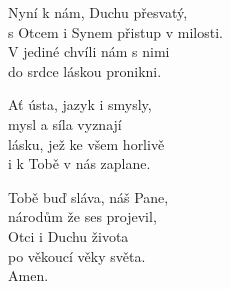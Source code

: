 \begin{translatioMulticol}{3}
Nyní k nám, Duchu přesvatý,\\
s Otcem i Synem přistup v milosti.\\
V jediné chvíli nám s nimi\\
do srdce láskou pronikni.\columnbreak

Ať ústa, jazyk i smysly,\\
mysl a síla vyznají\\
lásku, jež ke všem horlivě\\
i k Tobě v nás zaplane.\columnbreak

Tobě buď sláva, náš Pane,\\
národům že ses projevil,\\
Otci i Duchu života\\
po věkoucí věky světa.\\
Amen.
\end{translatioMulticol}
